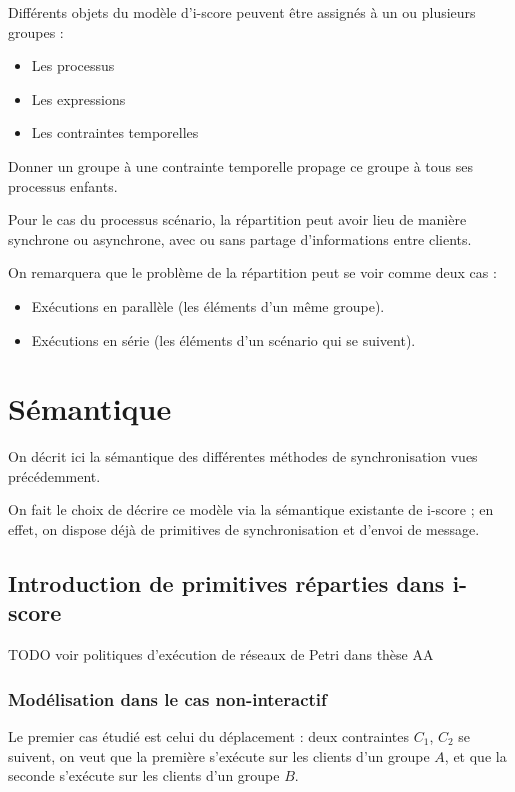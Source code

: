 \documentclass{article}
\begin{document}
Différents objets du modèle d'i-score peuvent être assignés à un ou plusieurs groupes : 

\begin{itemize}
	\item Les processus
	\item Les expressions
	\item Les contraintes temporelles
\end{itemize}

Donner un groupe à une contrainte temporelle propage ce groupe à tous ses processus enfants.

Pour le cas du processus scénario, la répartition peut avoir lieu de manière synchrone ou asynchrone, 
avec ou sans partage d'informations entre clients.

On remarquera que le problème de la répartition peut se voir comme deux cas : 
\begin{itemize}
	\item Exécutions en parallèle (les éléments d'un même groupe).
	\item Exécutions en série (les éléments d'un scénario qui se suivent).
\end{itemize}

\section{Sémantique}\label{sec.semantique}
On décrit ici la sémantique des différentes méthodes de synchronisation vues précédemment.

On fait le choix de décrire ce modèle via la sémantique existante de i-score ; en effet, on dispose déjà de primitives de synchronisation et d'envoi de message.


\subsection{Introduction de primitives réparties dans i-score}
TODO voir politiques d'exécution de réseaux de Petri dans thèse AA

\subsubsection{Modélisation dans le cas non-interactif}
Le premier cas étudié est celui du déplacement : deux contraintes $C_1$, $C_2$ se suivent, on veut que la première s'exécute sur les clients d'un groupe $A$, et que la seconde s'exécute sur les clients d'un groupe $B$.
\begin{figure}[h]
    \centering
    \begin{tikzpicture}
    
    \end{tikzpicture}
    \label{scenar.simple}
\end{figure}
\end{document}
